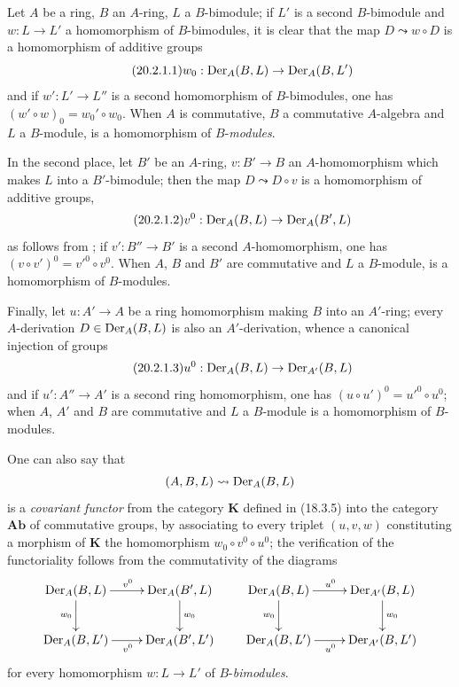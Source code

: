 \begin{env}[20.2.1]
\label{0.20.2.1}
Let $A$ be a ring, $B$ an $A$-ring, $L$ a $B$-bimodule; if $L'$ is a second $B$-bimodule and $w:L\to L'$ a homomorphism of $B$-bimodules, it is clear that the map $D\leadsto w\circ D$ is a homomorphism of additive groups
\begin{equation}
\tag{20.2.1.1}
  \label{0.20.2.1.1}
  w_0:\operatorname{Der}_A(B,L)\to\operatorname{Der}_A(B,L')
\end{equation}
and if $w':L'\to L''$ is a second homomorphism of $B$-bimodules, one has $(w'\circ w)_0=w_0'\circ w_0$.
When $A$ is commutative, $B$ a commutative $A$-algebra and $L$ a $B$-module,  is a homomorphism of $B$-\emph{modules}.

In the second place, let $B'$ be an $A$-ring, $v:B'\to B$ an $A$-homomorphism which makes $L$ into a $B'$-bimodule; then the map $D\leadsto D\circ v$ is a homomorphism of additive groups,
\begin{equation}
\tag{20.2.1.2}
  \label{0.20.2.1.2}
  v^0:\operatorname{Der}_A(B,L)\to\operatorname{Der}_A(B',L)
\end{equation}
as follows from ; if $v':B''\to B'$ is a second $A$-homomorphism, one has $(v\circ v')^0=v'^0\circ v^0$.
When $A$, $B$ and $B'$ are commutative and $L$ a $B$-module,  is a homomorphism of $B$-modules.

Finally, let $u:A'\to A$ be a ring homomorphism making $B$ into an $A'$-ring; every $A$-derivation $D\in\operatorname{Der}_A(B,L)$ is also an $A'$-derivation, whence a canonical injection of groups
\begin{equation}
\tag{20.2.1.3}
  \label{0.20.2.1.3}
  u^0:\operatorname{Der}_A(B,L)\to\operatorname{Der}_{A'}(B,L)
\end{equation}
and if $u':A''\to A'$ is a second ring homomorphism, one has $(u\circ u')^0=u'^0\circ u^0$;
when $A$, $A'$ and $B$ are commutative and $L$ a $B$-module  is a homomorphism of $B$-modules.

One can also say that
\[
  (A,B,L)\leadsto\operatorname{Der}_A(B,L)
\]
is a \emph{covariant functor} from the category $\boldsymbol{K}$ defined in (18.3.5) into the category $\boldsymbol{Ab}$ of commutative groups, by associating to every triplet $(u,v,w)$ constituting a morphism of $\boldsymbol{K}$ the homomorphism $w_0\circ v^0\circ u^0$; the verification of the functoriality follows from the commutativity of the diagrams
\[
\xymatrix{
  \Der_A(B,L) \ar[r]^{v^0} \ar[d]_{w_0} & \Der_A(B',L) \ar[d]^{w_0} \\
  \Der_A(B,L') \ar[r]_{v^0} & \Der_A(B',L')
}
\qquad
\xymatrix{
  \Der_A(B,L) \ar[r]^{u^0} \ar[d]_{w_0} & \Der_{A'}(B,L) \ar[d]^{w_0} \\
  \Der_A(B,L') \ar[r]_{u^0} & \Der_{A'}(B,L')
}
\]
for every homomorphism $w:L\to L'$ of $B$-\emph{bimodules}.
\end{env}

